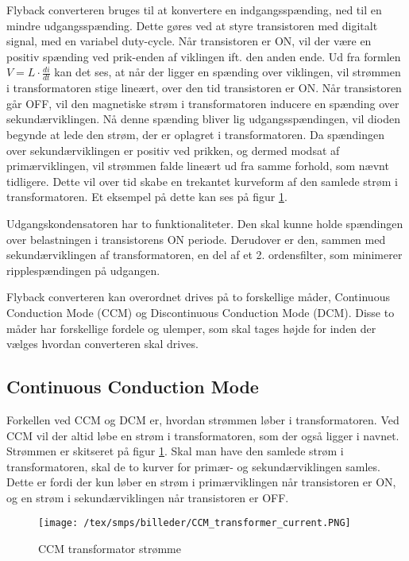 Flyback converteren bruges til at konvertere en indgangsspænding, ned til en mindre udgangsspænding. Dette gøres ved at styre transistoren med digitalt signal, med en variabel duty-cycle. Når transistoren er ON, vil der være en positiv spænding ved prik-enden af viklingen ift. den anden ende. Ud fra formlen $V=L\cdot \frac{di}{dt}$ kan det ses, at når der ligger en spænding over viklingen, vil strømmen i transformatoren stige lineært, over den tid transistoren er ON. Når transistoren går OFF, vil den magnetiske strøm i transformatoren inducere en spænding over sekundærviklingen. Nå denne spænding bliver lig udgangsspændingen, vil dioden begynde at lede den strøm, der er oplagret i transformatoren. Da spændingen over sekundærviklingen er positiv ved prikken, og dermed modsat af primærviklingen, vil strømmen falde lineært ud fra samme forhold, som nævnt tidligere. Dette vil over tid skabe en trekantet kurveform af den samlede strøm i transformatoren. Et eksempel på dette kan ses på figur \ref{fig:CCM_transformer_current}.

Udgangskondensatoren har to funktionaliteter. Den skal kunne holde spændingen over belastningen i transistorens ON periode. Derudover er den, sammen med sekundærviklingen af transformatoren, en del af et 2. ordensfilter, som minimerer ripplespændingen på udgangen.

Flyback converteren kan overordnet drives på to forskellige måder, Continuous Conduction Mode (CCM) og Discontinuous Conduction Mode (DCM). Disse to måder har forskellige fordele og ulemper, som skal tages højde for inden der vælges hvordan converteren skal drives. 

\subsection{Continuous Conduction Mode}
Forkellen ved CCM og DCM er, hvordan strømmen løber i transformatoren. Ved CCM vil der altid løbe en strøm i transformatoren, som der også ligger i navnet. Strømmen er skitseret på figur \ref{fig:CCM_transformer_current}. Skal man have den samlede strøm i transformatoren, skal de to kurver for primær- og sekundærviklingen samles. Dette er fordi der kun løber en strøm i primærviklingen når transistoren er ON, og en strøm i sekundærviklingen når transistoren er OFF. 

\begin{figure}[H]
	\center
	\texttt{[image: /tex/smps/billeder/CCM\_transformer\_current.PNG]}
	\caption{CCM transformator strømme}
	\label{fig:CCM_transformer_current}
\end{figure}

